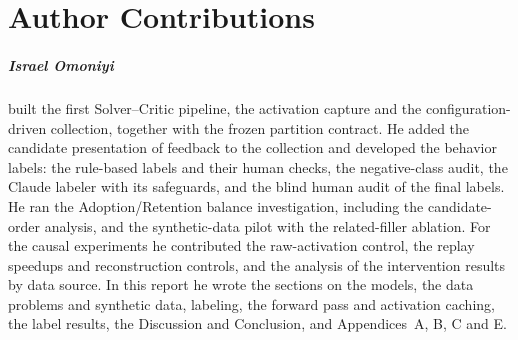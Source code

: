 \chapter*{Author Contributions}

\paragraph{Israel Omoniyi} built the first Solver--Critic pipeline, the
activation capture and the configuration-driven collection, together with the
frozen partition contract. He added the candidate presentation of feedback to
the collection and developed the behavior labels: the rule-based labels and
their human checks, the negative-class audit, the Claude labeler with its
safeguards, and the blind human audit of the final labels. He ran the
Adoption/Retention balance investigation, including the candidate-order
analysis, and the synthetic-data pilot with the related-filler ablation. For
the causal experiments he contributed the raw-activation control, the replay
speedups and reconstruction controls, and the analysis of the intervention
results by data source. In this report he wrote the sections on the models,
the data problems and synthetic data, labeling, the forward pass and
activation caching, the label results, the Discussion and Conclusion, and
Appendices~A, B, C and E.
